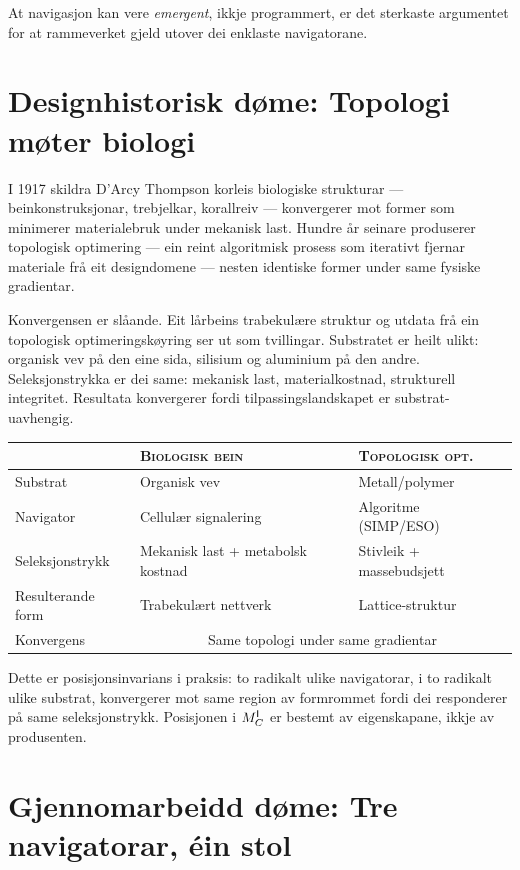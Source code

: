 At navigasjon kan vere \emph{emergent}, ikkje programmert, er det
sterkaste argumentet for at rammeverket gjeld utover dei enklaste
navigatorane.


\section{Designhistorisk døme: Topologi møter biologi}

I 1917 skildra D'Arcy Thompson korleis biologiske strukturar ---
beinkonstruksjonar, trebjelkar, korallreiv --- konvergerer mot
former som minimerer materialebruk under mekanisk last. Hundre år
seinare produserer topologisk optimering --- ein reint algoritmisk
prosess som iterativt fjernar materiale frå eit designdomene ---
nesten identiske former under same fysiske gradientar.

Konvergensen er slåande. Eit lårbeins trabekulære struktur og
utdata frå ein topologisk optimeringskøyring ser ut som tvillingar.
Substratet er heilt ulikt: organisk vev på den eine sida,
silisium og aluminium på den andre. Seleksjonstrykka er
dei same: mekanisk last, materialkostnad, strukturell integritet.
Resultata konvergerer fordi tilpassingslandskapet er
substrat-uavhengig.

\medskip
\begin{center}
\begin{tabular}{@{}lll@{}}
\toprule
& \textsc{Biologisk bein} & \textsc{Topologisk opt.} \\
\midrule
Substrat & Organisk vev & Metall/polymer \\
Navigator & Cellulær signalering & Algoritme (SIMP/ESO) \\
Seleksjonstrykk & Mekanisk last + metabolsk kostnad
  & Stivleik + massebudsjett \\
Resulterande form & Trabekulært nettverk & Lattice-struktur \\
Konvergens & \multicolumn{2}{c}{Same topologi under same gradientar} \\
\bottomrule
\end{tabular}
\end{center}

\medskip
Dette er posisjonsinvarians i praksis: to radikalt ulike
navigatorar, i to radikalt ulike substrat, konvergerer mot same
region av formrommet fordi dei responderer på same
seleksjonstrykk. Posisjonen i $M^{\mathsf{I}}_C$ er bestemt av eigenskapane,
ikkje av produsenten.


\section{Gjennomarbeidd døme: Tre navigatorar, éin stol}

